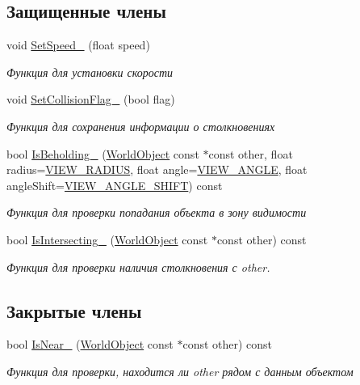 \subsection*{Защищенные члены}
\begin{DoxyCompactItemize}
\item 
void \hyperlink{classrtm_1_1_dynamic_object_aceb38c6ff9d41d814953d4538e32542f}{Set\+Speed\+\_\+} (float speed)
\begin{DoxyCompactList}\small\item\em Функция для установки скорости \end{DoxyCompactList}\item 
void \hyperlink{classrtm_1_1_dynamic_object_a50d64daac674d1e9f55ce1fb73cf9d6a}{Set\+Collision\+Flag\+\_\+} (bool flag)
\begin{DoxyCompactList}\small\item\em Функция для сохранения информации о столкновениях \end{DoxyCompactList}\item 
bool \hyperlink{classrtm_1_1_dynamic_object_a8ed34444a34b29ff9a672839c6593558}{Is\+Beholding\+\_\+} (\hyperlink{classrtm_1_1_world_object}{World\+Object} const $\ast$const other, float radius=\hyperlink{namespacertm_a6ae2631935a995c34abce1c62fa3dcd7}{V\+I\+E\+W\+\_\+\+R\+A\+D\+I\+US}, float angle=\hyperlink{namespacertm_af0ecac808d3938e77a20990f1947c8fd}{V\+I\+E\+W\+\_\+\+A\+N\+G\+LE}, float angle\+Shift=\hyperlink{namespacertm_a10eed490bb183c7853ac317d82e0b1cd}{V\+I\+E\+W\+\_\+\+A\+N\+G\+L\+E\+\_\+\+S\+H\+I\+FT}) const
\begin{DoxyCompactList}\small\item\em Функция для проверки попадания объекта в зону видимости \end{DoxyCompactList}\item 
bool \hyperlink{classrtm_1_1_dynamic_object_a96af6b5ed31d2332a3a45acfbdf084e5}{Is\+Intersecting\+\_\+} (\hyperlink{classrtm_1_1_world_object}{World\+Object} const $\ast$const other) const
\begin{DoxyCompactList}\small\item\em Функция для проверки наличия столкновения с other. \end{DoxyCompactList}\end{DoxyCompactItemize}
\subsection*{Закрытые члены}
\begin{DoxyCompactItemize}
\item 
bool \hyperlink{classrtm_1_1_dynamic_object_a3df4074c83b3ab30d3080b4e99e08a5b}{Is\+Near\+\_\+} (\hyperlink{classrtm_1_1_world_object}{World\+Object} const $\ast$const other) const
\begin{DoxyCompactList}\small\item\em Функция для проверки, находится ли other рядом с данным объектом \end{DoxyCompactList}\end{DoxyCompactItemize}
